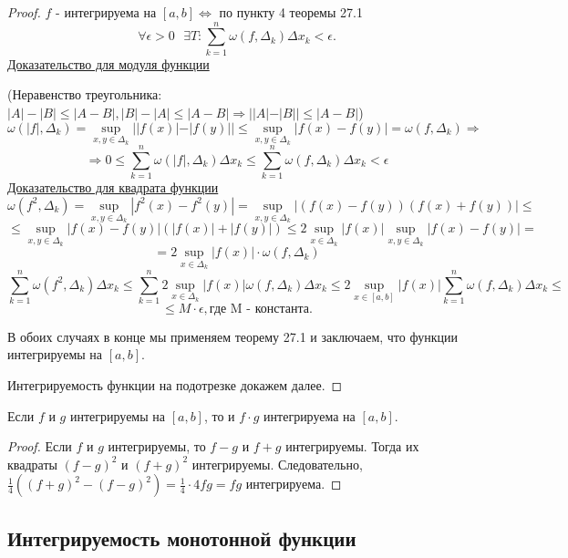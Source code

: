     \begin{proof}
    	$f$ - интегрируема на $[a, b] \Leftrightarrow$ по пункту 4 теоремы 27.1 
    	\[ \forall \epsilon > 0 \text{ } \exists T: \sum_{k = 1}^n \omega(f, \Delta_k) \Delta x_k < \epsilon. \]
    	\underline{Доказательство для модуля функции}
    	
    	(Неравенство треугольника: $|A| - |B| \leqslant |A - B|, |B| - |A| \leqslant |A - B| \Rightarrow ||A| - |B|| \leqslant |A - B|$)
    	\[ \omega(|f|, \Delta_k) = \sup_{x, y \in \Delta_k} {||f(x)| - |f(y)||} \leqslant \sup_{x, y \in \Delta_k} {|f(x) - f(y)|} = \omega(f, \Delta_k) \Rightarrow \]
    	\[ \Rightarrow 0 \leqslant \sum_{k = 1}^n {\omega(|f|, \Delta_k)} \Delta x_k \leqslant \sum_{k = 1}^n \omega(f, \Delta_k) \Delta x_k < \epsilon \]
    	\underline{Доказательство для квадрата функции}
    	\[ \omega(f^2, \Delta_k) = \sup_{x, y \in \Delta_k} {|f^2(x) - f^2(y)|} = \sup_{x, y \in \Delta_k} {|(f(x) - f(y))(f(x) + f(y))|} \leqslant \]
    	\[ \leqslant \sup_{x, y \in \Delta_k} {|f(x) - f(y)|(|f(x)| + |f(y)|)} \leqslant 2\sup_{x \in \Delta_k} {|f(x)|} \sup_{x, y \in \Delta_k} {|f(x) - f(y)|} = \]
    	\[ = 2\sup_{x \in \Delta_k} {|f(x)|} \cdot \omega(f, \Delta_k) \]
    	\[ \sum_{k = 1}^n \omega(f^2, \Delta_k) \Delta x_k \leqslant \sum_{k = 1}^n 2\sup_{x \in \Delta_k} {|f(x)| \omega(f, \Delta_k) \Delta x_k} \leqslant 2\sup_{x \in [a, b]} |f(x)| \sum_{k = 1}^n \omega(f, \Delta_k) \Delta x_k \leqslant \]
    	\[ \leqslant M \cdot \epsilon, \text{где M - константа}. \]
    	
    	В обоих случаях в конце мы применяем теорему 27.1 и заключаем, что функции интегрируемы на $[a, b]$.
    	
    	Интегрируемость функции на подотрезке докажем далее.
    \end{proof}
    
    \begin{corollary}
    	Если $f$ и $g$ интегрируемы на $[a, b]$, то и $f \cdot g$ интегрируема на $[a, b]$.
    \end{corollary}
    
    \begin{proof}
    	Если $f$ и $g$ интегрируемы, то $f - g$ и $f + g$ интегрируемы. Тогда их квадраты $(f - g)^2$ и $(f + g)^2$ интегрируемы. Следовательно, $\frac{1}{4}((f + g)^2 - (f - g)^2) = \frac{1}{4} \cdot 4fg = fg$ интегрируема.
    \end{proof}
    
    \subsection{Интегрируемость монотонной функции}
    
